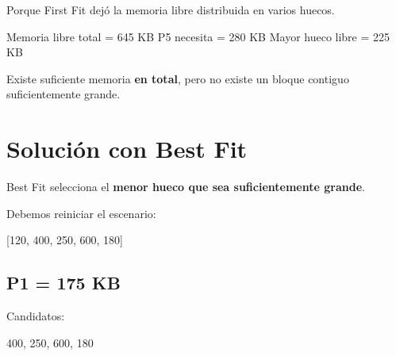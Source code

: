 \documentclass[
  spanish,
  letterpaper,
]{scrbook}
\newenvironment{Shaded}{\begin{snugshade}}{\end{snugshade}}
\newcommand{\NormalTok}[1]{\textcolor[rgb]{0.00,0.23,0.31}{#1}}
\begin{document}
\begin{tcolorbox}[enhanced jigsaw, arc=.35mm, bottomrule=.15mm, bottomtitle=1mm, breakable, colback=white, colbacktitle=quarto-callout-note-color!10!white, colframe=quarto-callout-note-color-frame, coltitle=black, left=2mm, leftrule=.75mm, opacityback=0, opacitybacktitle=0.6, rightrule=.15mm, title=\textcolor{quarto-callout-note-color}{\faInfo}\hspace{0.5em}{¿Por qué P5 no cabe si existen 645 KB libres?}, titlerule=0mm, toprule=.15mm, toptitle=1mm]

Porque First Fit dejó la memoria libre distribuida en varios huecos.

\begin{Shaded}
\begin{Highlighting}[]
\NormalTok{Memoria libre total = 645 KB}
\NormalTok{P5 necesita         = 280 KB}
\NormalTok{Mayor hueco libre   = 225 KB}
\end{Highlighting}
\end{Shaded}

Existe suficiente memoria \textbf{en total}, pero no existe un bloque
contiguo suficientemente grande.

\end{tcolorbox}


\chapter{Solución con Best Fit}\label{soluciuxf3n-con-best-fit}

Best Fit selecciona el \textbf{menor hueco que sea suficientemente
grande}.

Debemos reiniciar el escenario:

\begin{Shaded}
\begin{Highlighting}[]
\NormalTok{[120, 400, 250, 600, 180]}
\end{Highlighting}
\end{Shaded}

\section{P1 = 175 KB}\label{p1-175-kb-1}

Candidatos:

\begin{Shaded}
\begin{Highlighting}[]
\NormalTok{400, 250, 600, 180}
\end{Highlighting}
\end{Shaded}
\end{document}
